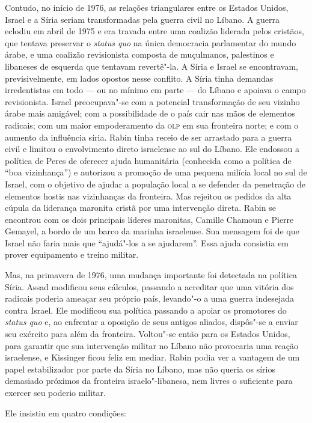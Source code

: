 Contudo, no início de 1976, as relações triangulares entre os Estados Unidos,
Israel e a Síria seriam transformadas pela guerra civil no Líbano. A
guerra eclodiu em abril de 1975 e era travada entre uma coalizão
liderada pelos cristãos, que tentava preservar o \emph{status quo} na
única democracia parlamentar do mundo árabe, e uma coalizão revisionista
composta de muçulmanos, palestinos e libaneses de esquerda que tentavam
revertê"-la. A Síria e Israel se encontravam, previsivelmente, em lados
opostos nesse conflito. A Síria tinha demandas irredentistas em todo ---
ou no mínimo em parte --- do Líbano e apoiava o campo revisionista.
Israel preocupava"-se com a potencial transformação de seu vizinho árabe
mais amigável; com a possibilidade de o país cair nas mãos de elementos
radicais; com um maior empoderamento da \textsc{olp} em sua fronteira norte; e
com o aumento da influência síria. Rabin tinha receio de ser arrastado
para a guerra civil e limitou o envolvimento direto israelense ao sul do
Líbano. Ele endossou a política de Peres de oferecer ajuda humanitária
(conhecida como a política de ``boa vizinhança'') e autorizou a promoção de
uma pequena milícia local no sul de Israel, com o objetivo de ajudar a população
local a se defender da penetração de elementos hostis nas vizinhanças da
fronteira. Mas rejeitou os pedidos da alta cúpula da liderança maronita
cristã por uma intervenção direta. Rabin se encontrou com os dois
principais líderes maronitas, Camille Chamoun e Pierre Gemayel, a bordo
de um barco da marinha israelense. Sua mensagem foi de que Israel não
faria mais que ``ajudá"-los a se ajudarem''. Essa ajuda consistia em
prover equipamento e treino militar.

Mas, na primavera de 1976, uma mudança importante foi detectada na
política Síria. Assad modificou seus cálculos, passando a acreditar que
uma vitória dos radicais poderia ameaçar seu próprio país, levando"-o a
uma guerra indesejada contra Israel. Ele modificou sua política passando
a apoiar os promotores do \emph{status quo} e, ao enfrentar a oposição
de seus antigos aliados, dispôs"-se a enviar seu exército para além da
fronteira. Voltou"-se então para os Estados Unidos, para garantir que sua
intervenção militar no Líbano não provocaria uma reação israelense, e
Kissinger ficou feliz em mediar. Rabin podia ver a vantagem de um papel
estabilizador por parte da Síria no Líbano, mas não queria os sírios
demasiado próximos da fronteira israelo"-libanesa, nem livres o
suficiente para exercer seu poderio militar.

Ele insistiu em quatro condições:

